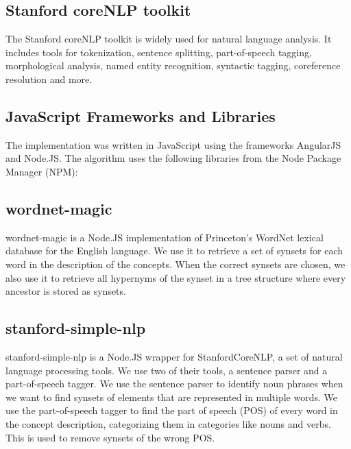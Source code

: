 \subsection{Stanford coreNLP toolkit}
The Stanford coreNLP toolkit is widely used for natural language analysis. It includes tools for tokenization, sentence splitting, part-of-speech tagging, morphological analysis, named entity recognition, syntactic tagging, coreference resolution and more. \parencite{manning}

\subsection{JavaScript Frameworks and Libraries}

The implementation was written in JavaScript using the frameworks AngularJS and Node.JS. The algorithm uses the following libraries from the Node Package Manager (NPM):
\subsection{wordnet-magic}
wordnet-magic is a Node.JS implementation of Princeton's WordNet lexical database for the English language. We use it to retrieve a set of synsets for each word in the description of the concepts. When the correct synsets are chosen, we also use it to retrieve all hypernyms of the synset in a tree structure where every ancestor is stored as synsets. 

\subsection{stanford-simple-nlp}
stanford-simple-nlp is a Node.JS wrapper for StanfordCoreNLP, a set of natural language processing tools. We use two of their tools, a sentence parser and a part-of-speech tagger. We use the sentence parser to identify noun phrases when we want to find synsets of elements that are represented in multiple words. We use the part-of-speech tagger to find the part of speech (POS) of every word in the concept description, categorizing them in categories like nouns and verbs. This is used to remove synsets of the wrong POS.


